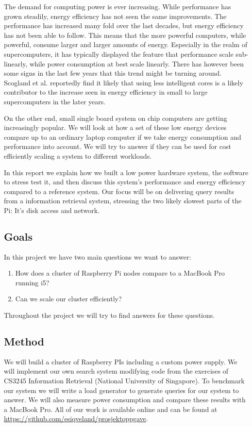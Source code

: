 The demand for computing power is ever increasing. While performance has grown steadily, energy efficiency has not seen the same improvements.
The performance has increased many fold over the last decades, but energy efficiency has not been able to follow. This means that the more powerful computers, while powerful, consume larger and larger amounts of energy.
Especially in the realm of supercomputers, it has typically displayed the feature that performance scale sub-linearly, while power consumption at best scale linearly.
There has however been some signs in the last few years that this trend might be turning around\cite{green500}.
Scogland et al.\cite{green500} reportedly find it likely that using less intelligent cores is a likely contributor to the increase seen in energy efficiency in small to large supercomputers in the later years.

On the other end, small single board system on chip computers are getting increasingly popular.
We will look at how a set of these low energy devices compare up to an ordinary laptop computer if we take energy consumption and performance into account. We will try to answer if they can be used for cost efficiently scaling a system to different workloads.

In this report we explain how we built a low power hardware system, the software to stress test it, and then discuss this system's performance and energy efficiency compared to a reference system. Our focus will be on delivering query results from a information retrieval system, stressing the two likely slowest parts of the Pi:
It's disk access and network.

\subsection{Goals}
In this project we have two main questions we want to answer:
\begin{enumerate}
\item How does a cluster of Raspberry Pi nodes compare to a MacBook Pro running i5?
\item Can we scale our cluster efficiently?
\end{enumerate}

Throughout the project we will try to find answers for these questions.

\subsection{Method}
We will build a cluster of Raspberry PIs including a custom power supply. We will implement our own search system modifying code from the exercises of CS3245 Information Retrieval (National University of Singapore). To benchmark our system we will write a load generator to generate queries for our system to answer. We will also measure power consumption and compare these results with a MacBook Pro. 
All of our work is available online and can be found at \url{https://github.com/esiqveland/prosjektoppgave}.


